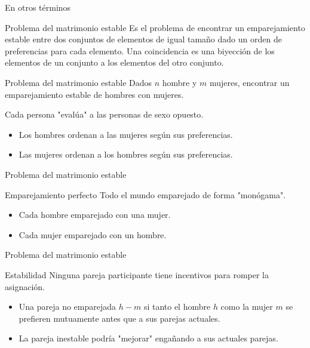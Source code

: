\begin{frame}[c]{En otros términos}
  \begin{block}{Problema del matrimonio estable}
    Es el problema de encontrar un emparejamiento estable entre dos conjuntos
    de elementos de igual tamaño dado un orden de preferencias para cada
    elemento. Una coincidencia es una biyección de los elementos de un
    conjunto a los elementos del otro conjunto.
  \end{block}
\end{frame}

\begin{frame}[c]{Problema del matrimonio estable}
  Dados $n$ hombre y $m$ mujeres, encontrar un emparejamiento estable de
  hombres con mujeres.

  \vspace{\baselineskip}
  Cada persona "evalúa" a las personas de sexo opuesto.
  \begin{itemize}
    \item Los hombres ordenan a las mujeres según sus preferencias.
    \item Las mujeres ordenan a los hombres según sus preferencias.
  \end{itemize}
\end{frame}

\begin{frame}[c]{Problema del matrimonio estable}
  \begin{block}{Emparejamiento perfecto}
    Todo el mundo emparejado de forma "monógama".
    \begin{itemize}
      \item Cada hombre emparejado con una mujer.
      \item Cada mujer emparejado con un hombre.
    \end{itemize}
  \end{block}
\end{frame}

\begin{frame}[c]{Problema del matrimonio estable}
  \begin{block}{Estabilidad}
    Ninguna pareja participante tiene incentivos para romper la asignación.
    \begin{itemize}
      \item Una pareja no emparejada $h-m$ si tanto el hombre $h$ como la mujer
        $m$ se prefieren mutuamente antes que a sus parejas actuales.
      \item La pareja inestable podría "mejorar" engañando a sus actuales
        parejas.
    \end{itemize}
  \end{block}
\end{frame}
